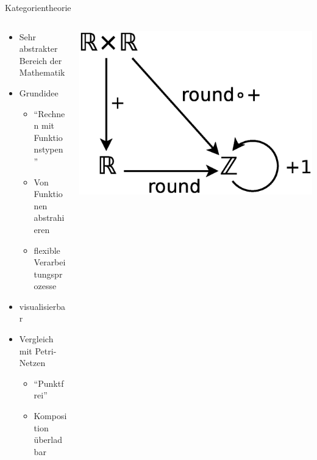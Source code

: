 \documentclass{beamer}
\newcommand{\pfeil}{\item[$\Rightarrow$]}
\begin{document}
\begin{frame}{Kategorientheorie}
  \begin{columns}
    \begin{column}{7cm}
      \begin{itemize}
      \item Sehr abstrakter Bereich der Mathematik
        \item Grundidee
          \begin{itemize}
          \item ``Rechnen mit Funktionstypen''
          \item Von Funktionen abstrahieren
          \pfeil flexible Verarbeitungsprozesse
          \end{itemize}
        \item visualisierbar
          \item Vergleich mit Petri-Netzen
            \begin{itemize}
            \item ``Punktfrei''
            \item Komposition überladbar
            \end{itemize}
      \end{itemize}
    \end{column}
    \begin{column}{4.5cm}
      \begin{center}
        \includegraphics[scale=0.3]{images/cat_funs}
      \end{center}
    \end{column}
  \end{columns}
\end{frame}
\end{document}
